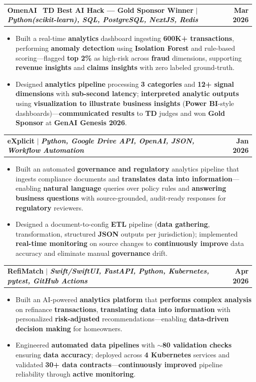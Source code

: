 \documentclass[letterpaper,10pt]{article}
\makeatletter
\newcommand{\resumeItem}[1]{
  \item\small{
    {#1 \vspace{-1pt}}
  }
}
\newcommand{\resumeProjectHeading}[2]{
    \item
    \begin{tabular*}{1.001\textwidth}{l@{\extracolsep{\fill}}r}
      \small#1 & \textbf{\small #2}\\
    \end{tabular*}\vspace{-9pt}
}
\newcommand{\resumeItemListStart}{\begin{itemize}[leftmargin=0.15in]}
\newcommand{\resumeItemListEnd}{\end{itemize}\vspace{-4pt}}
\makeatother
\begin{document}
    \resumeProjectHeading
          {\textbf{OmenAI} \textbar\ \textbf{TD Best AI Hack --- Gold Sponsor Winner} $|$ \emph{\textbf{Python(scikit-learn), SQL, PostgreSQL, NextJS, Redis}}}{Mar 2026}
    \resumeItemListStart
    \resumeItem{Built a real-time \textbf{analytics} dashboard ingesting \textbf{600K+ transactions}, performing \textbf{anomaly detection} using \textbf{Isolation Forest} and rule-based scoring---flagged \textbf{top 2\%} as high-risk across \textbf{fraud} dimensions, supporting \textbf{revenue insights} and \textbf{claims insights} with zero labeled ground-truth.}
    \vspace{-2pt}
    \resumeItem{Designed \textbf{analytics pipeline} processing \textbf{3 categories} and \textbf{12+ signal dimensions} with \textbf{sub-second latency}; \textbf{interpreted analytic outputs} using \textbf{visualization to illustrate business insights} (\textbf{Power BI}-style dashboards)---\textbf{communicated results} to \textbf{TD} judges and won \textbf{Gold Sponsor} at \textbf{GenAI Genesis 2026}.}
          \resumeItemListEnd 
          \vspace{-18pt}

      \resumeProjectHeading
          {\textbf{eXplicit} $|$ \emph{\textbf{Python, Google Drive API, OpenAI, JSON, Workflow Automation}}}{Jan 2026}
          \resumeItemListStart
            \resumeItem{Built an automated \textbf{governance and regulatory} analytics pipeline that ingests compliance documents and \textbf{translates data into information}---enabling \textbf{natural language} queries over policy rules and \textbf{answering business questions} with source-grounded, audit-ready responses for \textbf{regulatory} reviewers.}
            \vspace{-2pt}
            \resumeItem{Designed a document-to-config \textbf{ETL} pipeline (\textbf{data gathering}, transformation, structured \textbf{JSON} outputs per jurisdiction); implemented \textbf{real-time monitoring} on source changes to \textbf{continuously improve} data accuracy and eliminate manual \textbf{governance} drift.}
          \resumeItemListEnd
          \vspace{-18pt}

      \resumeProjectHeading
{\textbf{RefiMatch} $|$ \emph{\textbf{Swift/SwiftUI, FastAPI, Python, Kubernetes, pytest, GitHub Actions}}}{Apr 2026}
\resumeItemListStart
    \resumeItem{Built an AI-powered \textbf{analytics platform} that \textbf{performs complex analysis} on refinance \textbf{transactions}, \textbf{translating data into information} with personalized \textbf{risk-adjusted} recommendations---enabling \textbf{data-driven decision making} for homeowners.}
    \vspace{-2pt}
    \resumeItem{Engineered \textbf{automated data pipelines} with \textbf{$\sim$80 validation checks} ensuring \textbf{data accuracy}; deployed across \textbf{4 Kubernetes} services and validated \textbf{30+ data contracts}---\textbf{continuously improved} pipeline reliability through \textbf{active monitoring}.}
\resumeItemListEnd
          \vspace{-8pt}
          
\end{document}
